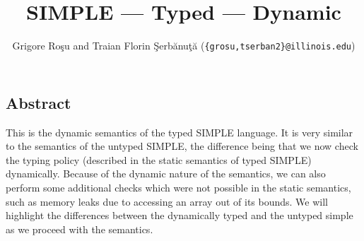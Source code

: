 \setlength{\parindent}{1em}
\title{SIMPLE --- Typed --- Dynamic}
\author{Grigore Ro\c{s}u and 
        Traian Florin \c{S}erb\u{a}nu\c{t}\u{a}
        (\texttt{\{grosu,tserban2\}@illinois.edu})}

\maketitle

\begin{latexComment}
\section{Abstract}
This is the \K dynamic semantics of the typed SIMPLE language.
It is very similar to the semantics of the untyped SIMPLE, the
difference being that we now check the typing policy (described in
the static semantics of typed SIMPLE) dynamically.  Because of the
dynamic nature of the semantics, we can also perform some additional
checks which were not possible in the static semantics, such as
memory leaks due to accessing an array out of its bounds.  We will
highlight the differences between the dynamically typed and the
untyped simple as we proceed with the semantics.
\end{latexComment}

\vspace*{3ex}
